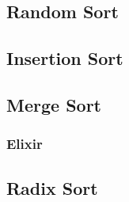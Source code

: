 \subsection{Random Sort}
\subsubsection{\csharp}

\subsection{Insertion Sort}
\subsubsection{\csharp}

\subsection{Merge Sort}
\subsubsection{\csharp}
\subsubsection{Elixir}

\subsection{Radix Sort}

